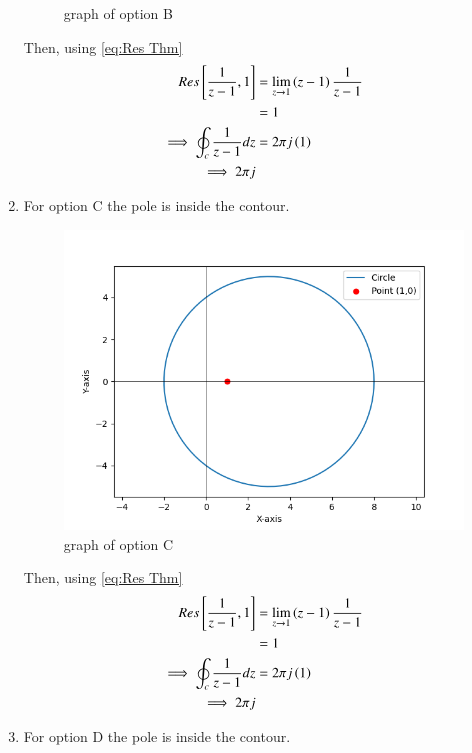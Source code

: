 \documentclass[journal,12pt,twocolumn]{IEEEtran}
\theoremstyle{remark}
\begin{document}
\begin{enumerate}
\begin{figure}[h!]
    \caption{graph of option B}
\end{figure}
Then, using \eqref{eq:Res Thm}
\begin{align}
Res{}\left[\frac{1}{z-1},1\right] &=\lim_{z\to 1}\left(z-1\right)\frac{1}{z-1}\\
&=1\\
\implies \oint_{c}\frac{1}{z-1}dz&=2\pi j\left(1\right)\\
\implies 2\pi j
\end{align}
\item For option C the pole is inside the contour.\\
\begin{figure}[h!]
    \centering
    \includegraphics[width=1\columnwidth]{2023/BM/48/figs/plotg233.png}
    \caption{graph of option C}
\end{figure}
Then, using \eqref{eq:Res Thm}
\begin{align}
Res{}\left[\frac{1}{z-1},1\right] &=\lim_{z\to 1}\left(z-1\right)\frac{1}{z-1}\\
&=1\\
\implies \oint_{c}\frac{1}{z-1}dz&=2\pi j\left(1\right)\\
\implies 2\pi j
\end{align}
\item For option D the pole is inside the contour.\\
\begin{figure}[h!]
    \centering

\end{figure}
\end{enumerate}
\end{document}
